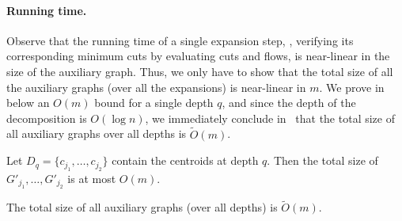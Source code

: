 \documentclass{toc}
\theoremstyle{plain}
\newcommand\tO{\ensuremath{\widetilde O}}  %
\begin{document}
\paragraph{Running time.}
Observe that the running time of a single expansion step,
\ie, verifying its corresponding minimum cuts by evaluating cuts and flows,
is near-linear in the size of the auxiliary graph.
Thus, we only have to show that the total size of all the auxiliary graphs
(over all the expansions) is near-linear in $m$.
We prove in  below an $O(m)$ bound for a single depth $q$,
and since the depth of the decomposition is $O(\log n)$,
we immediately conclude in~
that the total size of all auxiliary graphs over all depths is $\tO(m)$.

\begin{lemma}\label{lemma:size}
Let $D_q=\{c_{j_1},\dots,c_{j_2}\}$ contain the centroids at depth $q$.
Then the total size of $G'_{j_1},\dots,G'_{j_2}$ is at most $O(m)$.
\end{lemma}

\begin{corollary}\label{cor:total}
The total size of all auxiliary graphs
(over all depths) is $\tO(m)$.
\end{corollary}
\end{document}
